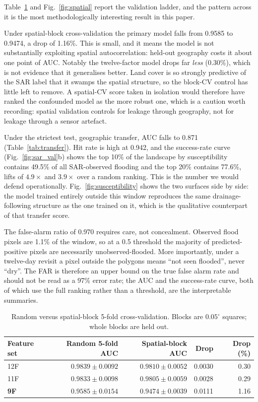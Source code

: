 \documentclass[10pt,twocolumn]{article}
\begin{document}
Table~\ref{tab:spatial} and Fig.~\ref{fig:spatial} report the validation
ladder, and the pattern across it is the most methodologically interesting result
in this paper.

Under spatial-block cross-validation the primary model falls from 0.9585 to
0.9474, a drop of 1.16\%. This is small, and it means the model is not
substantially exploiting spatial autocorrelation: held-out geography costs it
about one point of AUC. Notably the twelve-factor model drops far \emph{less}
(0.30\%), which is not evidence that it generalises better. Land cover is so
strongly predictive of the SAR label that it swamps the spatial structure, so the
block-CV control has little left to remove. A spatial-CV score taken in isolation
would therefore have ranked the confounded model as the more robust one, which is
a caution worth recording: spatial validation controls for leakage through
geography, not for leakage through a sensor artefact.

Under the strictest test, geographic transfer, AUC falls to 0.871
(Table~\ref{tab:transfer}). Hit rate is high at 0.942, and the success-rate curve
(Fig.~\ref{fig:sar_val}b) shows the top 10\% of the landscape by susceptibility
contains 49.5\% of all SAR-observed flooding and the top 20\% contains 77.6\%,
lifts of $4.9\times$ and $3.9\times$ over a random ranking. This is the number we
would defend operationally. Fig.~\ref{fig:susceptibility} shows the two
surfaces side by side: the model trained entirely outside this window
reproduces the same drainage-following structure as the one trained on it,
which is the qualitative counterpart of that transfer score.

The false-alarm ratio of 0.970 requires care, not concealment. Observed
flood pixels are 1.1\% of the window, so at a 0.5 threshold the majority of
predicted-positive pixels are necessarily unobserved-flooded. More importantly,
under a twelve-day revisit a pixel outside the polygons means ``not seen
flooded'', never ``dry''. The FAR is therefore an upper bound on the true false
alarm rate and should not be read as a 97\% error rate; the AUC and the
success-rate curve, both of which use the full ranking rather than a threshold,
are the interpretable summaries.

\begin{table}[!t]
\centering\footnotesize
\caption{Random versus spatial-block 5-fold cross-validation. Blocks are
$0.05^\circ$ squares; whole blocks are held out.}
\label{tab:spatial}
\small
\begin{tabular}{@{}lrrrr@{}}
\toprule
\textbf{Feature set} & \textbf{Random 5-fold AUC} & \textbf{Spatial-block AUC} &
\textbf{Drop} & \textbf{Drop (\%)} \\
\midrule
12F & $0.9839\pm0.0092$ & $0.9810\pm0.0052$ & 0.0030 & 0.30 \\
11F & $0.9833\pm0.0098$ & $0.9805\pm0.0059$ & 0.0028 & 0.29 \\
\textbf{9F} & $0.9585\pm0.0154$ & $0.9474\pm0.0039$ & 0.0111 & 1.16 \\
\bottomrule
\end{tabular}
\end{table}
\end{document}
